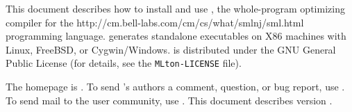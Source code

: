 This document describes how to install and use {\mlton}, the
whole-program optimizing compiler for the
		  {http://cm.bell-labs.com/cm/cs/what/smlnj/sml.html}
programming language.
{\mlton} generates standalone executables on X86 machines with
Linux, FreeBSD, or Cygwin/Windows. 
{\mlton} is distributed under the GNU General Public License (for details, see
the {\tt MLton-LICENSE} file).

The {\mlton} homepage is \absolutelink{}.
To send {\mlton}'s authors a comment, question, or bug report, use
{\mltonmail}.
To send mail to the {\mlton} user community, use
{\mltonUserMail}.
This document describes {\mlton} version {\version}.

